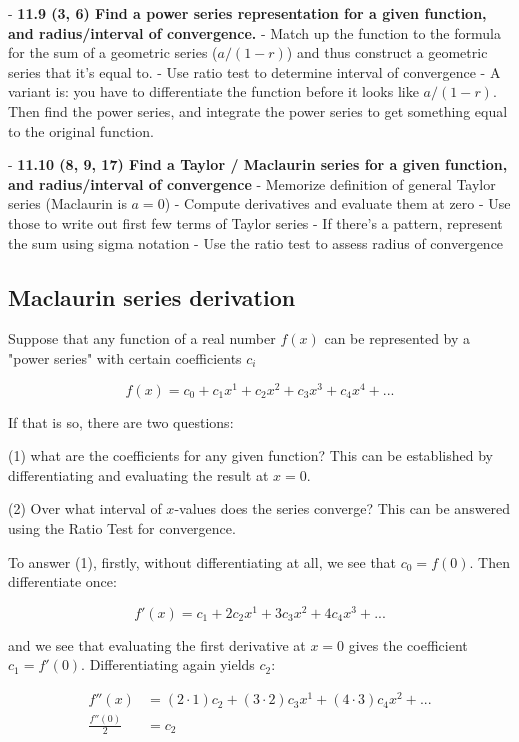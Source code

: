 - \textbf{11.9 (3, 6) Find a power series representation for a given function, and radius/interval of convergence.}
    - Match up the function to the formula for the sum of a geometric series ($a/(1-r)$) and thus construct a geometric series that it's equal to.
    - Use ratio test to determine interval of convergence
    - A variant is: you have to differentiate the function before it looks like $a/(1-r)$. Then find the power series, and integrate the power series to get something equal to the original function.

- \textbf{11.10 (8, 9, 17) Find a Taylor / Maclaurin series for a given function, and radius/interval of convergence}
    - Memorize definition of general Taylor series (Maclaurin is $a=0$)
    - Compute derivatives and evaluate them at zero
    - Use those to write out first few terms of Taylor series
    - If there's a pattern, represent the sum using sigma notation
    - Use the ratio test to assess radius of convergence


\subsection{Maclaurin series derivation}

Suppose that any function of a real number $f(x)$ can be represented by a "power series" with certain coefficients $c_i$

$$
f(x) = c_0 + c_1x^1 + c_2x^2 + c_3x^3 + c_4x^4 + ...
$$

If that is so, there are two questions:

(1) what are the coefficients for any given function? This can be established
by differentiating and evaluating the result at $x=0$.

(2) Over what interval of $x$-values does the series converge? This can be
answered using the Ratio Test for convergence.

To answer (1), firstly, without differentiating at all, we see that $c_0 = f(0)$. Then differentiate once:

$$
f'(x) = c_1 + 2c_2x^1 + 3c_3x^2 + 4c_4x^3 + ...
$$

and we see that evaluating the first derivative at $x=0$ gives the coefficient
$c_1 = f'(0)$. Differentiating again yields $c_2$:

\begin{align*}
f''(x) &= (2\cdot 1)c_2 + (3\cdot 2)c_3x^1 + (4\cdot 3)c_4x^2 + ... \\
\frac{f''(0)}{2} &= c_2
\end{align*}

